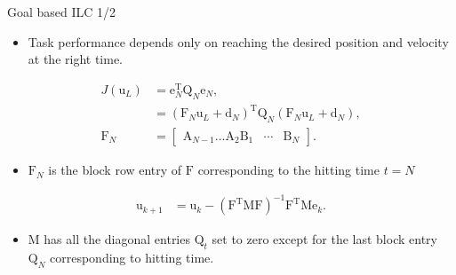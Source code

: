 \documentclass[handout]{beamer}
\newcommand{\boldvec}[1]{\boldsymbol{\mathrm{#1}}}
\let\vec\boldvec
\newcommand{\error}{\vec{e}} %
\newcommand{\linDist}{\vec{d}} %
\newcommand{\sysInput}{\vec{u}} %
\newcommand{\ValueFunction}{J}
\begin{document}
\begin{frame}{Goal based ILC 1/2}
\begin{itemize}
\item Task performance depends only on reaching the desired position and velocity at the right time.
\end{itemize}
\begin{equation}
\begin{aligned}
\ValueFunction(\sysInput_L) &= \error_{N}^{\mathrm{T}}\vec{Q}_{N}\error_{N}, \\
&= (\vec{F}_N\sysInput_L + \linDist_N)^{\mathrm{T}}\vec{Q}_{N}(\vec{F}_N\sysInput_L + \linDist_N), \\
\vec{F}_N &= 
 \begin{bmatrix}
  \vec{A}_{N-1} \ldots \vec{A}_2 \vec{B}_1 & \cdots & \vec{B}_N 
 \end{bmatrix}.
\end{aligned}
\end{equation}
\begin{itemize}
\item $\vec{F}_{N}$ is the block row entry of $\vec{F}$ corresponding to the hitting time $t = N$
\end{itemize}
\begin{equation}
\begin{aligned}
\sysInput_{k+1} &= \sysInput_k - (\vec{F}^{\mathrm{T}}\vec{M}\vec{F})^{-1}\vec{F}^{\mathrm{T}}\vec{M}\error_k.
\end{aligned}
\end{equation}
\begin{itemize}
\item $\vec{M}$ has all the diagonal entries $\vec{Q}_{t}$ set to zero except for the last block entry $\vec{Q}_{N}$ corresponding to hitting time.
\end{itemize}
\end{frame}
%
\end{document}
